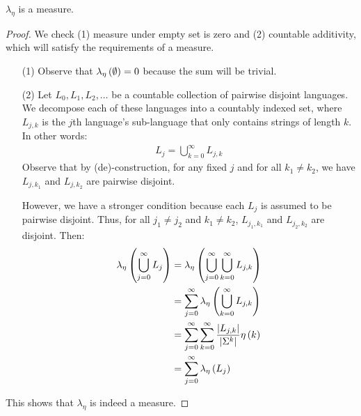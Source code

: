 \begin{theorem}
  \(\lambda_{\eta}\) is a measure.
\end{theorem}
\begin{proof}
  We check (1) measure under empty set is zero and (2) countable additivity,
  which will satisfy the requirements of a measure.
  \begin{enumerate}
    \item[(1)]
      Observe that \(\lambda_{\eta} \left(\emptyset\right) = 0\) because the sum
      will be trivial.

    \item[(2)]
      Let \(L_0, L_1, L_2, \ldots\) be a countable collection of pairwise
      disjoint languages.
      We decompose each of these languages into a countably indexed set,
      where \(L_{j, k}\) is the \(j\)th language's sub-language
      that only contains strings of length \(k\).
      In other words:
      \begin{align*}
        L_j = \bigcup_{k = 0}^{\infty} L_{j, k}
      \end{align*}
      Observe that by (de)-construction, for any fixed \(j\) and for all
      \(k_1 \neq k_2\), we have \(L_{j, k_1}\) and \(L_{j, k_2}\) are
      pairwise disjoint.

      However, we have a stronger condition because each \(L_j\) is
      assumed to be pairwise disjoint.
      Thus, for all \(j_1 \neq j_2\) and \(k_1 \neq k_2\),
      \(L_{j_1, k_1}\) and \(L_{j_2, k_2}\) are disjoint.
      Then:
      \begin{align*}
        \lambda_{\eta} \left(\bigcup_{j = 0}^{\infty} L_j\right)
          &= \lambda_{\eta} \left(\bigcup_{j = 0}^{\infty}
                            \bigcup_{k = 0}^{\infty} L_{j, k}\right) \\
          &= \sum_{j = 0}^{\infty}
              \lambda_{\eta} \left(\bigcup_{k = 0}^{\infty} L_{j, k}\right) \\
          &= \sum_{j = 0}^{\infty}
              \sum_{k = 0}^{\infty}
              \frac{\left\lvert L_{j, k}\right\rvert}{\left\lvert\Sigma^k\right\rvert}
                \eta\left(k\right) \\
          &= \sum_{j = 0}^{\infty} \lambda_{\eta} \left(L_j\right)
      \end{align*}
  \end{enumerate}
  This shows that \(\lambda_{\eta} \) is indeed a measure.
\end{proof}


